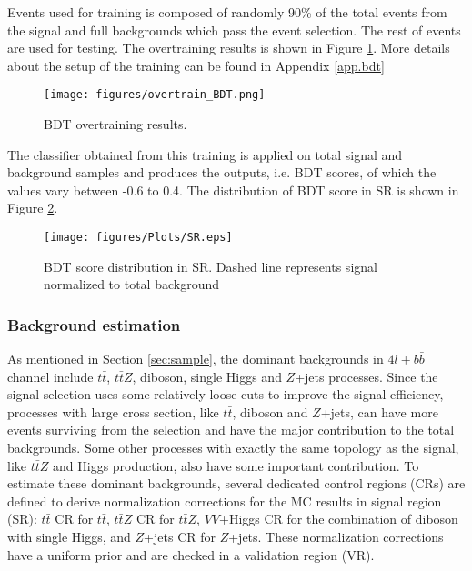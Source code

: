 Events used for training is composed of randomly 90\% of the total events from the signal  and full backgrounds which pass the event selection. The rest of events are used for testing. The overtraining results is shown in Figure \ref{Fig.overtraining}. More details about the setup of the training can be found in Appendix \ref{app.bdt}

\begin{figure}[H]
	\caption{BDT overtraining results.}
	\label{Fig.overtraining}
	\centering
	\texttt{[image: figures/overtrain\_BDT.png]}
\end{figure}

The classifier obtained from this training is applied on total signal and background samples and produces the outputs, i.e. BDT scores, of which the values vary between -0.6 to 0.4. The distribution of BDT score in SR is shown in Figure \ref{Fig.SR pre-fit}. 

\begin{figure}[H]
	\caption{BDT score distribution in SR. Dashed line represents signal normalized to total background}
	\label{Fig.SR pre-fit}
	\centering
	\texttt{[image: figures/Plots/SR.eps]}
\end{figure}

\subsubsection{Background estimation}
\label{subsubsec:bkg}

As mentioned in Section \ref{sec:sample}, the dominant backgrounds in $4l+b\bar{b}$ channel include $t\bar{t}$, $t\bar{t}Z$, diboson, single Higgs and $Z$+jets processes. Since the signal selection uses some relatively loose cuts to improve the signal efficiency, processes with large cross section, like $t\bar{t}$, diboson and $Z$+jets, can have more events surviving from the selection and have the major contribution to the total backgrounds. Some other processes with exactly the same topology as the signal, like $t\bar{t}Z$ and Higgs production, also have some important contribution. To estimate these dominant backgrounds, several dedicated control regions (CRs) are defined to derive normalization corrections for the MC results in signal region (SR): $t\bar{t}$ CR for $t\bar{t}$, $t\bar{t}Z$ CR for $t\bar{t}Z$, $VV$+Higgs CR for the combination of diboson with single Higgs, and $Z$+jets CR for $Z$+jets. These normalization corrections have a uniform prior and are checked in a validation region (VR).

